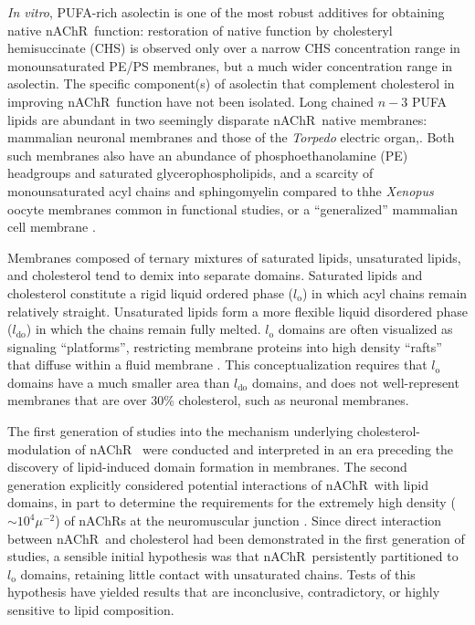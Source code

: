 \documentclass[final,3p,times,twocolumn]{elsarticle}
\newcommand{\lo}{l_{\mathrm{o}}}
\newcommand{\ldo}{l_{\mathrm{do}}}
\newcommand{\nachr}{nAChR}
\begin{document}
{\it In vitro}, PUFA-rich asolectin\cite{Regost2003,Olsen2003} is one of the most robust additives\cite{Criado1982} for obtaining native \nachr~function: restoration of native function by cholesteryl hemisuccinate (CHS) is observed only over a narrow CHS concentration range in monounsaturated PE/PS membranes, but a much wider concentration range in asolectin\cite{Criado1982}. The specific component(s) of asolectin that complement cholesterol in improving \nachr~function have not been isolated. 
Long chained $n-3$  
PUFA lipids are abundant in two seemingly disparate \nachr~native membranes: mammalian neuronal membranes\cite{Breckenridge_Adult_1973,Cotman_Lipid_1969} and those of the \textit{Torpedo} electric organ,\cite{Barrantes1989,Quesada2016}. Both such membranes also have an abundance of phosphoethanolamine (PE) headgroups and saturated glycerophospholipids, and a scarcity of monounsaturated acyl chains and sphingomyelin compared to thhe \textit{Xenopus} oocyte membranes \cite{Hill_Isolation_2005} common in functional studies, or a ``generalized'' mammalian cell membrane \cite{Inglfsson_Lipid_2014}.    

Membranes composed of ternary mixtures of saturated lipids, unsaturated lipids, and cholesterol tend to demix into separate domains. Saturated lipids and cholesterol constitute a rigid liquid ordered phase ($\lo$) in which acyl chains remain relatively straight. \cite{Feller_Acyl_2008,Yeagle2016115,Cicuta1981,Bleecker2016} Unsaturated lipids form a more flexible liquid disordered phase ($\ldo$) in which the chains remain fully melted.  
$\lo$ domains are often visualized as signaling ``platforms'', restricting membrane proteins into high density ``rafts'' that diffuse within a fluid membrane {\cite{Simons1997,Simons2000}}. This conceptualization requires that $\lo$ domains have a much smaller area than $\ldo$ domains, and does not well-represent membranes that are over 30\% cholesterol, such as neuronal membranes.   

The first generation of studies into the mechanism underlying cholesterol-modulation of \nachr~ were conducted and interpreted in an era preceding the discovery of lipid-induced domain formation in membranes. 
The second generation explicitly considered potential interactions of \nachr~with lipid domains, in part to determine the requirements for the extremely high density  ($\sim10^{4}\mu^{-2}$) of \nachr s at the neuromuscular junction \cite{Breckenrldge1972}.  Since direct interaction between \nachr~and cholesterol had been demonstrated in the first generation of studies, a sensible initial hypothesis was that \nachr~persistently partitioned to $\lo$ domains, retaining little contact with unsaturated chains.  Tests of this hypothesis have yielded results that are inconclusive, contradictory, or highly sensitive to lipid composition.     
\end{document}
